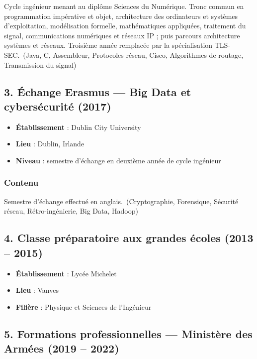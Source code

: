 \documentclass[11pt,a4paper]{article}
\newcommand{\stack}[1]{\ {\small\textcolor{accent}{(#1)}}}
\begin{document}
Cycle ingénieur menant au diplôme Sciences du Numérique. Tronc commun en programmation impérative et objet, architecture des ordinateurs et systèmes d'exploitation, modélisation formelle, mathématiques appliquées, traitement du signal, communications numériques et réseaux IP ; puis parcours architecture systèmes et réseaux. Troisième année remplacée par la spécialisation TLS-SEC.\stack{Java, C, Assembleur, Protocoles réseau, Cisco, Algorithmes de routage, Transmission du signal}

\subsection{3. Échange Erasmus --- Big Data et cybersécurité (2017)}

\begin{itemize}
  \item \textbf{Établissement} : Dublin City University
  \item \textbf{Lieu} : Dublin, Irlande
  \item \textbf{Niveau} : semestre d'échange en deuxième année de cycle ingénieur
\end{itemize}

\subsubsection{Contenu}

Semestre d'échange effectué en anglais.\stack{Cryptographie, Forensique, Sécurité réseau, Rétro-ingénierie, Big Data, Hadoop}

\subsection{4. Classe préparatoire aux grandes écoles (2013 -- 2015)}

\begin{itemize}
  \item \textbf{Établissement} : Lycée Michelet
  \item \textbf{Lieu} : Vanves
  \item \textbf{Filière} : Physique et Sciences de l'Ingénieur
\end{itemize}

\subsection{5. Formations professionnelles --- Ministère des Armées (2019 -- 2022)}
\end{document}
